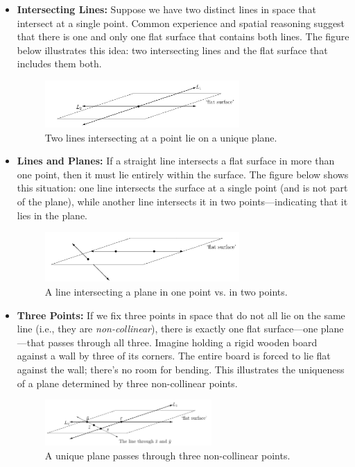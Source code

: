 \begin{itemize}
  \item \textbf{Intersecting Lines:} Suppose we have two distinct lines in space that intersect at a single point. Common experience and spatial reasoning suggest that there is one and only one flat surface that contains both lines. The figure below illustrates this idea: two intersecting lines and the flat surface that includes them both.

    \begin{figure}[htbp]
    \centering
    \includegraphics[width=0.7\textwidth]{figures/intersecting_lines.png}
    \caption{Two lines intersecting at a point lie on a unique plane.}
    \label{fig:intersecting-lines}
\end{figure}


  \item \textbf{Lines and Planes:} If a straight line intersects a flat surface in more than one point, then it must lie entirely within the surface. The figure below shows this situation: one line intersects the surface at a single point (and is not part of the plane), while another line intersects it in two points—indicating that it lies in the plane.
    \begin{figure}[htbp]
    \centering
    \includegraphics[width=0.7\textwidth]{figures/line_intersections_plane.png}
    \caption{A line intersecting a plane in one point vs. in two points.}
    \label{fig:line-plane-intersections}
\end{figure}

  

  \item \textbf{Three Points:} If we fix three points in space that do not all lie on the same line (i.e., they are \emph{non-collinear}), there is exactly one flat surface—one plane—that passes through all three. Imagine holding a rigid wooden board against a wall by three of its corners. The entire board is forced to lie flat against the wall; there's no room for bending. This illustrates the uniqueness of a plane determined by three non-collinear points.
        \begin{figure}[htbp]
    \centering
    \includegraphics[width=0.6\textwidth]{figures/three_points_plane.png}
    \caption{A unique plane passes through three non-collinear points.}
    \label{fig:three-points-plane}
\end{figure}


\end{itemize}
